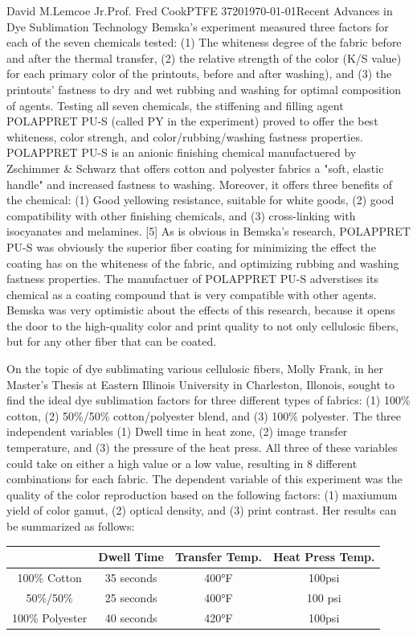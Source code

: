 \documentclass[12pt,letterpaper]{article}
\begin{document}
\begin{mla}{David M.}{Lemcoe Jr.}{Prof. Fred Cook}{PTFE 3720}{\today}{Recent Advances in Dye Sublimation Technology}
Bemska's experiment measured three factors for each of the seven chemicals tested: (1) The whiteness degree of the fabric before and after the thermal transfer, (2) the relative strength of the color (K/S value) for each primary color of the printouts, before and after washing), and (3) the printouts' fastness to dry and wet rubbing and washing for optimal composition of agents. Testing all seven chemicals, the stiffening and filling agent POLAPPRET PU-S (called PY in the experiment) proved to offer the best whiteness, color strengh, and color/rubbing/washing fastness properties. POLAPPRET PU-S is an anionic finishing chemical manufactuered by Zschimmer \& Schwarz that offers cotton and polyester fabrics a "soft, elastic handle" and increased fastness to washing. Moreover, it offers three benefits of the chemical: (1) Good yellowing resistance, suitable for white goods, (2) good compatibility with other finishing chemicals, and (3) cross-linking with isocyanates and melamines. [5] As is obvious in Bemska's research, POLAPPRET PU-S was obviously the superior fiber coating for minimizing the effect the coating has on the whiteness of the fabric, and optimizing rubbing and washing fastness properties. The manufactuer of POLAPPRET PU-S adverstises its chemical as a coating compound that is very compatible with other agents.  Bemska was very optimistic about the effects of this research, because it opens the door to the high-quality color and print quality to not only cellulosic fibers, but for any other fiber that can be coated.

On the topic of dye sublimating various cellulosic fibers, Molly Frank, in her Master's Thesis at Eastern Illinois University in Charleston, Illonois, sought to find the ideal dye sublimation factors for three different types of fabrics: (1) 100\% cotton, (2) 50\%/50\% cotton/polyester blend, and (3) 100\% polyester. The three independent variables  (1) Dwell time in heat zone, (2) image transfer temperature, and (3) the pressure of the heat press. All three of these variables could take on either a high value or a low value, resulting in 8 different combinations for each fabric. The dependent variable of this experiment was the quality of the color reproduction based on the following factors: (1) maxiumum yield of color gamut, (2) optical density, and (3) print contrast. Her results can be summarized as follows:

\vspace{5mm}
\begin{center}
\begin{tabular}{ | c | c | c | c | }
\hline
& Dwell Time & Transfer Temp. & Heat Press Temp. \\ \hline
100\% Cotton & 35 seconds & 400°F & 100psi \\ \hline
50\%/50\% & 25 seconds & 400°F & 100 psi \\ \hline
100\% Polyester & 40 seconds & 420°F & 100psi \\ \hline
\end{tabular}
\end{center}


\end{mla}
\end{document}
